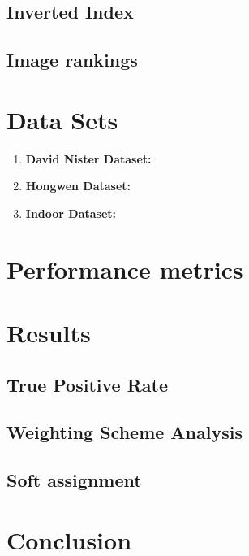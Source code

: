 \subsection{Inverted Index}
\subsection{Image rankings}

\section{Data Sets}
\begin{enumerate}
\item \textbf{David Nister Dataset:} 

\item \textbf{Hongwen Dataset:}

\item \textbf{Indoor Dataset:} 
\end{enumerate}

\section{Performance metrics}
\section{Results}
\subsection{True Positive Rate}
\subsection {Weighting Scheme Analysis}
\subsection {Soft assignment}
\section{Conclusion}

\label{sec:conclusion}
